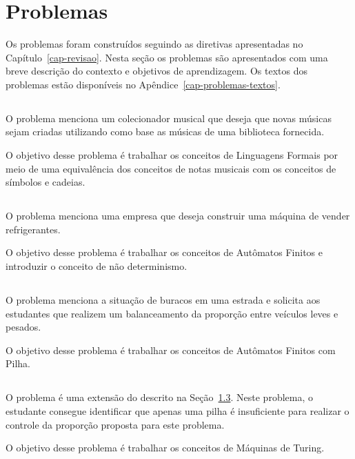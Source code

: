 \section{Problemas}
\label{sec-problemas-listas}
Os problemas foram construídos seguindo as diretivas
apresentadas no Capítulo~\ref{cap-revisao}.
Nesta seção os problemas são apresentados com uma breve
descrição do contexto e objetivos de aprendizagem.
Os textos dos problemas estão disponíveis no
Apêndice~\ref{cap-problemas-textos}.

\subsection{\ProblemaA}
O problema menciona um colecionador musical que deseja que
novas músicas sejam criadas utilizando como base as músicas
de uma biblioteca fornecida.

O objetivo desse problema é trabalhar os conceitos de
Linguagens Formais por meio de uma equivalência dos conceitos
de notas musicais com os conceitos de símbolos e cadeias.

\subsection{\ProblemaB}
O problema menciona uma empresa que deseja construir uma máquina
de vender refrigerantes.

O objetivo desse problema é trabalhar os conceitos de Autômatos
Finitos e introduzir o conceito de não determinismo.

\subsection{\ProblemaC}
\label{problema3}
O problema menciona a situação de buracos em uma estrada e
solicita aos estudantes que realizem um balanceamento da proporção
entre veículos leves e pesados.

O objetivo desse problema é trabalhar os conceitos de Autômatos
Finitos com Pilha.

\subsection{\ProblemaD}
O problema é uma extensão do descrito na Seção~\ref{problema3}.
Neste problema, o estudante consegue identificar que apenas uma pilha
é insuficiente para realizar o controle da proporção proposta para este
problema.

O objetivo desse problema é trabalhar os conceitos de Máquinas de Turing.

